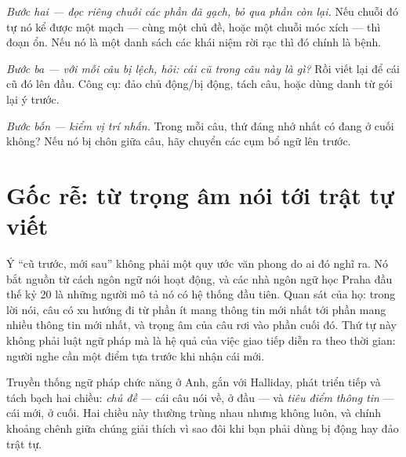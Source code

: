\documentclass[../../english.tex]{subfiles}
\begin{document}
\emph{Bước hai --- đọc riêng chuỗi các phần đã gạch, bỏ qua phần còn lại.} Nếu chuỗi đó tự nó kể được một mạch --- cùng một chủ đề, hoặc một chuỗi móc xích --- thì đoạn ổn. Nếu nó là một danh sách các khái niệm rời rạc thì đó chính là bệnh.

\emph{Bước ba --- với mỗi câu bị lệch, hỏi: cái cũ trong câu này là gì?} Rồi viết lại để cái cũ đó lên đầu. Công cụ: đảo chủ động/bị động, tách câu, hoặc dùng danh từ gói lại ý trước.

\emph{Bước bốn --- kiểm vị trí nhấn.} Trong mỗi câu, thứ đáng nhớ nhất có đang ở cuối không? Nếu nó bị chôn giữa câu, hãy chuyển các cụm bổ ngữ lên trước.

\begin{capdoi}
\end{capdoi}

\section{Gốc rễ: từ trọng âm nói tới trật tự viết}

Ý ``cũ trước, mới sau'' không phải một quy ước văn phong do ai đó nghĩ ra. Nó bắt nguồn từ cách ngôn ngữ nói hoạt động, và các nhà ngôn ngữ học Praha đầu thế kỷ 20 là những người mô tả nó có hệ thống đầu tiên. Quan sát của họ: trong lời nói, câu có xu hướng đi từ phần ít mang thông tin mới nhất tới phần mang nhiều thông tin mới nhất, và trọng âm của câu rơi vào phần cuối đó. Thứ tự này không phải luật ngữ pháp mà là hệ quả của việc giao tiếp diễn ra theo thời gian: người nghe cần một điểm tựa trước khi nhận cái mới.

Truyền thống ngữ pháp chức năng ở Anh, gắn với Halliday\cite{halliday1976}, phát triển tiếp và tách bạch hai chiều: \emph{chủ đề} --- cái câu nói về, ở đầu --- và \emph{tiêu điểm thông tin} --- cái mới, ở cuối. Hai chiều này thường trùng nhau nhưng không luôn, và chính khoảng chênh giữa chúng giải thích vì sao đôi khi bạn phải dùng bị động hay đảo trật tự.
\end{document}
